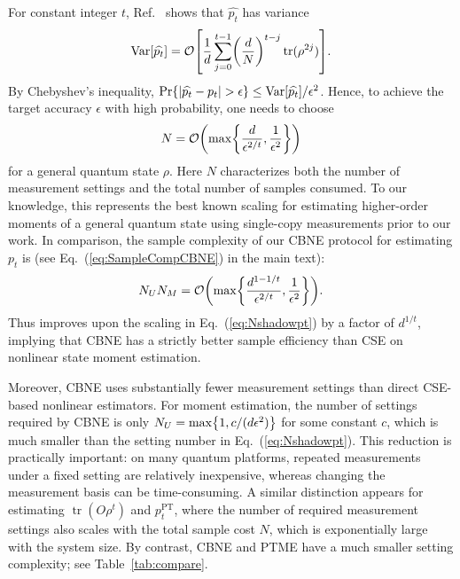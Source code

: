 \documentclass[aps,prl,twocolumn,nofootinbib,superscriptaddress,10pt]{revtex4-2}
\let\originalleft\left
\let\originalright\right
\renewcommand{\left}{\mathopen{}\mathclose\bgroup\originalleft}
\renewcommand{\right}{\aftergroup\egroup\originalright}
\DeclareMathOperator{\Var}{Var}
\DeclareMathOperator{\Tr}{tr}
\newcommand{\bigo}[1]{\mathcal{O}\left(#1\right)}
\theoremstyle{plain}
\theoremstyle{definition}
\newcommand{\PT}{\mathrm{PT}}
\def\eqref#1{\textup{(\ref{#1})}}
\newcommand{\eref}[1]{Eq.~\textup{(\ref{#1})}}
\begin{document}
For constant integer $t$, Ref.~\cite[Theorem~5.2]{pelecanos2026beating} shows that $\widehat{p_t}$ has variance
\begin{align}
\Var \left[\widehat{p_t} \right]
= \mathcal O \left[\frac{1}{d} \sum_{j=0}^{t-1} \left( \frac{d}{N}\right)^{t-j} \Tr(\rho^{2j})\right].
\end{align}
By Chebyshev's inequality, 
$\Pr\left\{ \left|\widehat{p_t}-p_t\right| > \epsilon \right\}
\leq \Var\left[\widehat{p_t} \right]/\epsilon^2$. 
Hence, to achieve the target accuracy $\epsilon$ with high probability, one needs to choose
\begin{align}\label{eq:Nshadowpt}
N=  \bigo{\max\left\lbrace \frac{d}{\epsilon^{2/t}}, \frac{1}{\epsilon^2} \right\rbrace}
\end{align}
for a general quantum state $\rho$. 
Here $N$ characterizes both the number of measurement settings and the total number of samples consumed. 
To our knowledge, this represents the best known scaling for estimating higher-order moments of a general quantum state using single-copy measurements prior to our work.
In comparison, the sample complexity of our CBNE protocol for estimating $p_t$ is (see \eref{eq:SampleCompCBNE} in the main text): 
\begin{align}
N_U N_M
=
\bigo{\max\left\lbrace
\frac{d^{1-1/t}}{\epsilon^{2/t}},
\frac{1}{\epsilon^2}
\right\rbrace }.
\end{align}
Thus improves upon the scaling in \eref{eq:Nshadowpt} by a factor of $d^{1/t}$, implying that CBNE has a strictly better sample efficiency than CSE on nonlinear state moment estimation. 



Moreover, CBNE uses substantially fewer measurement settings than direct CSE-based nonlinear estimators. 
For moment estimation, the number of settings required by CBNE is only
$N_U =  \max\left\lbrace 1, c/(d\epsilon^2)\right\rbrace$
for some constant \(c\), which is much smaller than the setting number in Eq.~\eqref{eq:Nshadowpt}. 
This reduction is practically important: on many quantum platforms, repeated measurements under a fixed setting are relatively inexpensive, whereas changing the measurement basis can be time-consuming.
A similar distinction appears for estimating \(\Tr(O\rho^t)\) and \(p_t^{\PT}\), where the number of required measurement settings also scales with the total sample cost $N$, which is exponentially large with the system size.   
By contrast, CBNE and PTME have a much smaller setting complexity; see Table~\ref{tab:compare}.
\end{document}
